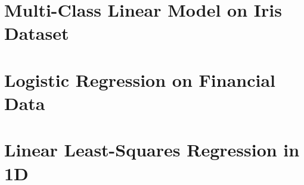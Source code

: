 \documentclass[12pt, a4 paper]{article}
\begin{document}

\label{prob:1.b}



\label{prob:1.c}


\section{Multi-Class Linear Model on Iris Dataset}
\label{sec:bayes20D}

\label{prob:2.i}



\label{prob:2.ii}


\section{Logistic Regression on Financial Data}
\label{sec:german}



\section{Linear Least-Squares Regression in 1D}
\label{sec:linearRegression}
\end{document}
